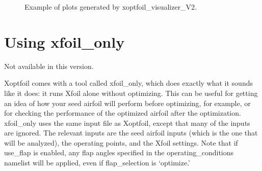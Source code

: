 \documentclass[11pt]{article}
\begin{document}
\begin{figure}
\centering

\caption{Example of plots generated by xoptfoil\_visualizer\_V2.}
\label{fig:visualizer_plot}
\end{figure}

\section{Using xfoil\_only}

Not available in this version.

Xoptfoil comes with a tool called xfoil\_only, which does exactly what it sounds like it
does: it runs Xfoil alone without optimizing. This can be useful for getting an idea of
how your seed airfoil will perform before optimizing, for example, or for checking the
performance of the optimized airfoil after the optimization. xfoil\_only uses the same
input file as Xoptfoil, except that many of the inputs are ignored. The relevant
inputs are the seed airfoil inputs (which is the one that will be analyzed), the operating
points, and the Xfoil settings. Note that if use\_flap is enabled, any flap angles 
specified in the operating\_conditions namelist will be applied, even if flap\_selection
is `optimize.' 
\end{document}
